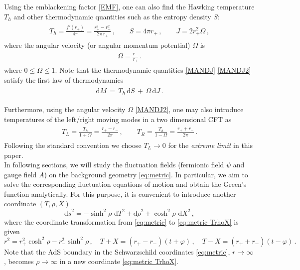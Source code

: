 \documentclass[11pt,a4paper]{article}
\newcommand{\td}{\text{d}}
\newcommand{\dd}{\mathrm{d}}
\begin{document}
Using the emblackening factor \eqref{EMF}, one can also find the Hawking temperature $T_h$ and other thermodynamic quantities such as the entropy density $S$:
\begin{align}
\begin{split}
T_h = \frac{f'(r_+)}{4\pi} = \frac{r_+^2-r_-^2}{2\pi \, r_+} \,, \qquad S = 4\pi r_+ \,, \qquad J = 2 r_+^2 \Omega \,,
\end{split}
\end{align}
where the angular velocity (or angular momentum potential) $\Omega$ is
\begin{align}\label{MANDJ2}
\begin{split}
\Omega  = \frac{r_-}{r_+} \,.
\end{split}
\end{align}
where $0 \leq \Omega \leq 1$.
Note that the thermodynamic quantities \eqref{MANDJ}-\eqref{MANDJ2} satisfy the first law of thermodynamics 
\begin{align}\label{}
\begin{split}
\dd M \,=\, T_h \, \dd S \,+\, \Omega \, \dd J \,.
\end{split}
\end{align}

%
Furthermore, using the angular velocity $\Omega$ \eqref{MANDJ2}, one may also introduce temperatures of the left/right moving modes in a two dimensional CFT as
\begin{align}\label{eq:TLTR OmegaT}
\begin{split}
     T_L  = \frac{T_h}{1+\Omega} = \frac{r_+ - r_-}{2 \pi}\,,\qquad
    T_R  = \frac{T_h}{1-\Omega} = \frac{r_+ + r_-}{2 \pi}\,.
\end{split}
\end{align}
Following the standard convention we choose $T_L\rightarrow0$ for the \textit{extreme limit} in this paper.\\

In following sections, we will study the fluctuation fields (fermionic field $\psi$ and gauge field $A$) on the background geometry \eqref{eq:metric}. In particular, we aim to solve the corresponding fluctuation equations of motion and obtain the Green's function analytically. 
For this purpose, it is convenient to introduce another coordinate $(T, \rho, X)$
\begin{equation}\label{eq:metric TrhoX}
    {\td s}^2 = -\sinh^2{\rho} \,\, {\td T}^2 + {\td \rho}^2 + \cosh^2{\rho} \,\, {\td X}^2\,,
\end{equation}
where the coordinate transformation from \eqref{eq:metric} to \eqref{eq:metric TrhoX} is given
\begin{equation} \label{eq:TorhoTX}
    r^2 = r_+^2 \cosh^2{\rho} - r_-^2 \sinh^2{\rho}\,,\quad
    T+X=(r_+-r_-)(t+\varphi)\,,\quad
    T-X=(r_+ + r_-)(t-\varphi)\,.
\end{equation}
Note that the AdS boundary in the Schwarzschild coordinates \eqref{eq:metric}, $r \rightarrow \infty$, becomes $\rho \rightarrow \infty$ in a new coordinate \eqref{eq:metric TrhoX}.
\end{document}
